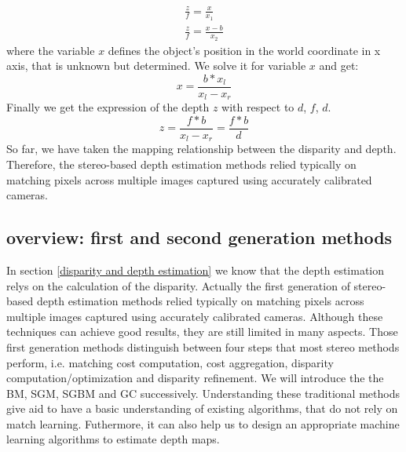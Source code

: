 \begin{gather}
\label{}
    \frac{z}{f} =  \frac{x}{x_1} \\
    \frac{z}{f} =  \frac{x-b}{x_2}
\end{gather}
where the variable $x$ defines the object's position in the world coordinate in x axis, that is unknown but determined. We solve it for variable $x$ and get: 
\begin{equation}
    x = \frac{b*x_l}{x_l-x_r}
\end{equation}
Finally we get the expression of the depth $z$ with respect to $d$, $f$, $d$.
\begin{equation}
    z = \frac{f*b}{x_l-x_r} = \frac{f*b}{d}
\end{equation}
So far, we have taken the mapping relationship between the disparity and depth. Therefore, the stereo-based depth estimation
methods relied typically on matching pixels across multiple images captured using accurately calibrated cameras. 

\subsection{overview: first and second generation methods}
\label{overview: first and second generation methods}
In section \ref{disparity and depth estimation} we know that the depth estimation relys on the calculation of the disparity. Actually the first generation of stereo-based depth estimation methods relied typically on matching pixels across multiple images captured using accurately calibrated cameras. Although these techniques can achieve good results, they are still limited in many aspects. Those first generation methods distinguish between four steps that most stereo methods perform, i.e. matching cost computation, cost aggregation, disparity computation/optimization and disparity
refinement\cite{scharstein2002taxonomy}. We will introduce the the BM, SGM, SGBM and GC successively. Understanding these traditional methods give aid to have a basic understanding of existing algorithms, that do not rely on match learning. Futhermore, it can also help us to design an appropriate machine learning algorithms to estimate depth maps. 

